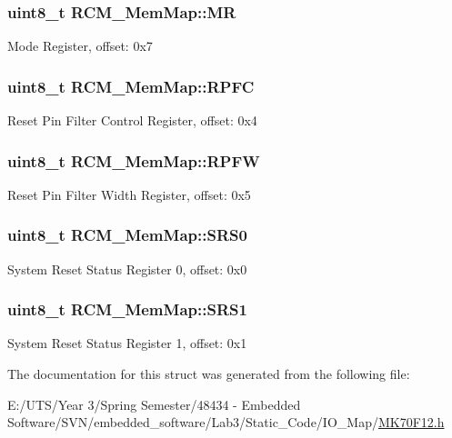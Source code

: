 \subsubsection[{M\+R}]{\setlength{\rightskip}{0pt plus 5cm}uint8\+\_\+t R\+C\+M\+\_\+\+Mem\+Map\+::\+M\+R}\label{struct_r_c_m___mem_map_a0e7b707ffc94ef2a3c49a5ca51acc6c9}
Mode Register, offset\+: 0x7 \hypertarget{struct_r_c_m___mem_map_ace89c039f8342f8b5dd26c3c7b8309a2}{}
\subsubsection[{R\+P\+F\+C}]{\setlength{\rightskip}{0pt plus 5cm}uint8\+\_\+t R\+C\+M\+\_\+\+Mem\+Map\+::\+R\+P\+F\+C}\label{struct_r_c_m___mem_map_ace89c039f8342f8b5dd26c3c7b8309a2}
Reset Pin Filter Control Register, offset\+: 0x4 \hypertarget{struct_r_c_m___mem_map_ac458f95f6aa234285f568694a5b8240d}{}
\subsubsection[{R\+P\+F\+W}]{\setlength{\rightskip}{0pt plus 5cm}uint8\+\_\+t R\+C\+M\+\_\+\+Mem\+Map\+::\+R\+P\+F\+W}\label{struct_r_c_m___mem_map_ac458f95f6aa234285f568694a5b8240d}
Reset Pin Filter Width Register, offset\+: 0x5 \hypertarget{struct_r_c_m___mem_map_aa28b91bdb2e1acc454f7bcb9ad26efb7}{}
\subsubsection[{S\+R\+S0}]{\setlength{\rightskip}{0pt plus 5cm}uint8\+\_\+t R\+C\+M\+\_\+\+Mem\+Map\+::\+S\+R\+S0}\label{struct_r_c_m___mem_map_aa28b91bdb2e1acc454f7bcb9ad26efb7}
System Reset Status Register 0, offset\+: 0x0 \hypertarget{struct_r_c_m___mem_map_a8e7926e6f51e64e63e5ed3adb7aee612}{}
\subsubsection[{S\+R\+S1}]{\setlength{\rightskip}{0pt plus 5cm}uint8\+\_\+t R\+C\+M\+\_\+\+Mem\+Map\+::\+S\+R\+S1}\label{struct_r_c_m___mem_map_a8e7926e6f51e64e63e5ed3adb7aee612}
System Reset Status Register 1, offset\+: 0x1 

The documentation for this struct was generated from the following file\+:\begin{DoxyCompactItemize}
\item 
E\+:/\+U\+T\+S/\+Year 3/\+Spring Semester/48434 -\/ Embedded Software/\+S\+V\+N/embedded\+\_\+software/\+Lab3/\+Static\+\_\+\+Code/\+I\+O\+\_\+\+Map/\hyperlink{_m_k70_f12_8h}{M\+K70\+F12.\+h}\end{DoxyCompactItemize}

